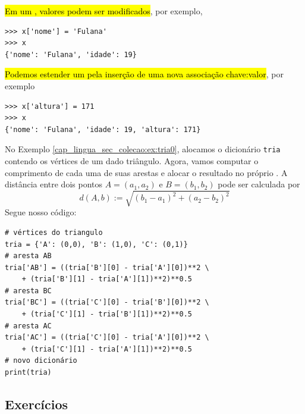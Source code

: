 \hl{Em um {\PYTHONdict}, valores podem ser modificados}, por exemplo,

\begin{lstlisting}
>>> x['nome'] = 'Fulana'
>>> x
{'nome': 'Fulana', 'idade': 19}
\end{lstlisting}

\hl{Podemos estender um {\PYTHONdict} pela inserção de uma nova associação chave:valor}, por exemplo

\begin{lstlisting}
>>> x['altura'] = 171
>>> x
{'nome': 'Fulana', 'idade': 19, 'altura': 171}
\end{lstlisting}

\begin{ex}
  No Exemplo \ref{cap_lingua_sec_colecao:ex:tria0}, alocamos o dicionário \lstinline+tria+ contendo os vértices de um dado triângulo. Agora, vamos computar o comprimento de cada uma de suas arestas e alocar o resultado no próprio {\PYTHONdict}. A distância entre dois pontos $A = (a_1, a_2)$ e $B = (b_1, b_2)$ pode ser calculada por
  \begin{equation}
    d(A, b) := \sqrt{(b_1-a_1)^2 + (a_2-b_2)^2}
  \end{equation}
  Segue nosso código:

\begin{lstlisting}
# vértices do triangulo
tria = {'A': (0,0), 'B': (1,0), 'C': (0,1)}
# aresta AB
tria['AB'] = ((tria['B'][0] - tria['A'][0])**2 \
    + (tria['B'][1] - tria['A'][1])**2)**0.5
# aresta BC
tria['BC'] = ((tria['C'][0] - tria['B'][0])**2 \
    + (tria['C'][1] - tria['B'][1])**2)**0.5
# aresta AC
tria['AC'] = ((tria['C'][0] - tria['A'][0])**2 \
    + (tria['C'][1] - tria['A'][1])**2)**0.5
# novo dicionário
print(tria)
\end{lstlisting}

\end{ex}

\subsection{Exercícios}

